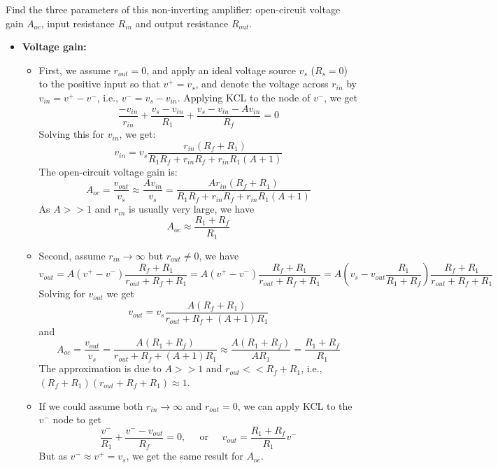 \usepackage{html}




  Find the three parameters of this non-inverting amplifier: open-circuit 
  voltage gain $A_{oc}$, input resistance $R_{in}$ and output resistance $R_{out}$.

  \begin{itemize}
    \item {\bf Voltage gain:} 
      \begin{itemize}
      \item First, we assume $r_{out}=0$, and apply an ideal voltage source $v_s$ 
        ($R_s=0$) to the positive input so that $v^+=v_s$, and denote the voltage 
      across $r_{in}$ by $v_{in}=v^+-v^-$, i.e., $v^-=v_s-v_{in}$. Applying KCL to 
      the node of $v^-$, we get
      \[ \frac{-v_{in}}{r_{in}}+\frac{v_s-v_{in}}{R_1}+\frac{v_s-v_{in}-Av_{in}}{R_f}=0 \]
      Solving this for $v_{in}$, we get:
      \[ v_{in}=v_s \frac{r_{in}(R_f+R_1)}{R_1R_f+r_{in}R_f+r_{in}R_1(A+1)} \]
      The open-circuit voltage gain is:
      \[ A_{oc}=\frac{v_{out}}{v_s}\approx \frac{Av_{in}}{v_s}
      =\frac{Ar_{in}(R_f+R_1)}{R_1R_f+r_{in}R_f+r_{in}R_1(A+1)} \]
      As $A>>1$ and $r_{in}$ is usually very large, we have
      \[ A_{oc}\approx \frac{R_1+R_f}{R_1} \]

      \item Second, assume $r_{in}\rightarrow \infty$ but $r_{out}\ne 0$,
	we have
      \[ v_{out}=A(v^+-v^-)\frac{R_f+R_1}{r_{out}+R_f+R_1} 
      =A(v^+-v^-)\frac{R_f+R_1}{r_{out}+R_f+R_1} 
      =A(v_s-v_{out}\frac{R_1}{R_1+R_f}) \frac{R_f+R_1}{r_{out}+R_f+R_1} \]
      Solving for $v_{out}$ we get
      \[ v_{out} =v_s \frac{A(R_f+R_1)}{r_{out}+R_f+(A+1)R_1} \]
      and 
      \[ A_{oc}=\frac{v_{out}}{v_s}=\frac{A(R_1+R_f)}{r_{out}+R_f+(A+1)R_1}
      \approx \frac{A(R_1+R_f)}{AR_1}=\frac{R_1+R_f}{R_1} \]
      The approximation is due to $A>>1$ and $r_{out}<<R_f+R_1$, i.e., 
      $(R_f+R_1)(r_{out}+R_f+R_1)\approx 1$. 

      \item If we could assume both $r_{in}\rightarrow \infty$ and $r_{out}=0$, 
      we can apply KCL to the $v^-$ node to get
      \[ \frac{v^-}{R_1}+\frac{v^--v_{out}}{R_f}=0, \;\;\;\;\;
      \mbox{or}\;\;\;\;\; v_{out}=\frac{R_1+R_f}{R_1} v^- \]
      But as $v^-\approx v^+=v_s$, we get the same result for $A_{oc}$.
      \end{itemize}


\end{itemize}
